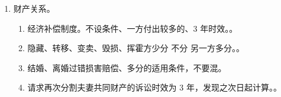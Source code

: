 \begin{enumerate}
\begin{enumerate}
\begin{enumerate}
                  \item 分孩子。2 岁一般给女方。8 岁以上问孩子 \hz 协商。
                  \item 离婚不影响监护。不得剥夺抚养、教育、保护、探望的权利。
                        。
                  \item 不能强制孩子。。
                \end{enumerate}
          \item 财产关系。
                \begin{enumerate}
                  \item 经济补偿制度。不设条件、一方付出较多的、3 年时效。。
                  \item 隐藏、转移、变卖、毁损、挥霍方少分 \hz 不分 \yjt 另一方多分。。
                  \item 结婚、离婚过错损害赔偿、多分的适用条件，不要混。
                  \item 请求再次分割夫妻共同财产的诉讼时效为 3 年，发现之次日起计算。。
                \end{enumerate}
        \end{enumerate}
\end{enumerate}
